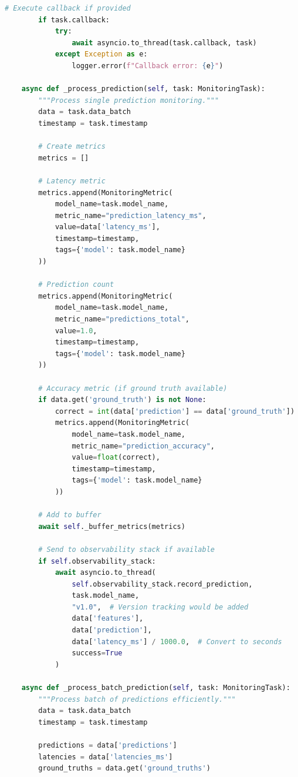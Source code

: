 \begin{lstlisting}[language=Python, caption={Production-Grade Model Monitor with Async Processing}]
        # Execute callback if provided
        if task.callback:
            try:
                await asyncio.to_thread(task.callback, task)
            except Exception as e:
                logger.error(f"Callback error: {e}")

    async def _process_prediction(self, task: MonitoringTask):
        """Process single prediction monitoring."""
        data = task.data_batch
        timestamp = task.timestamp

        # Create metrics
        metrics = []

        # Latency metric
        metrics.append(MonitoringMetric(
            model_name=task.model_name,
            metric_name="prediction_latency_ms",
            value=data['latency_ms'],
            timestamp=timestamp,
            tags={'model': task.model_name}
        ))

        # Prediction count
        metrics.append(MonitoringMetric(
            model_name=task.model_name,
            metric_name="predictions_total",
            value=1.0,
            timestamp=timestamp,
            tags={'model': task.model_name}
        ))

        # Accuracy metric (if ground truth available)
        if data.get('ground_truth') is not None:
            correct = int(data['prediction'] == data['ground_truth'])
            metrics.append(MonitoringMetric(
                model_name=task.model_name,
                metric_name="prediction_accuracy",
                value=float(correct),
                timestamp=timestamp,
                tags={'model': task.model_name}
            ))

        # Add to buffer
        await self._buffer_metrics(metrics)

        # Send to observability stack if available
        if self.observability_stack:
            await asyncio.to_thread(
                self.observability_stack.record_prediction,
                task.model_name,
                "v1.0",  # Version tracking would be added
                data['features'],
                data['prediction'],
                data['latency_ms'] / 1000.0,  # Convert to seconds
                success=True
            )

    async def _process_batch_prediction(self, task: MonitoringTask):
        """Process batch of predictions efficiently."""
        data = task.data_batch
        timestamp = task.timestamp

        predictions = data['predictions']
        latencies = data['latencies_ms']
        ground_truths = data.get('ground_truths')


\end{lstlisting}
